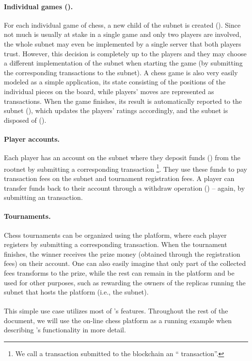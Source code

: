 \paragraph{Individual games ().}
For each individual game of chess, a new child of the  subnet is created ().
Since not much is usually at stake in a single game and only two players are involved,
the whole  subnet may even be implemented by a single server that both players trust.
However, this decision is completely up to the players and they may choose a different implementation of the  subnet
when starting the game (by submitting the corresponding transactions to the  subnet).
A chess game is also very easily modeled as a simple application, its state consisting of the positions of the individual pieces on the board,
while players' moves are represented as transactions.
When the game finishes, its result is automatically reported to the  subnet (), which updates the players' ratings accordingly,
and the  subnet is disposed of ().

\paragraph{Player accounts.}
Each player has an account on the  subnet where they deposit funds () from the rootnet by submitting a corresponding  transaction%
\footnote{We call a transaction submitted to the  blockchain an `` transaction''.}.
They use these funds to pay transaction fees on the  subnet and tournament registration fees.
A player can transfer funds back to their  account through a withdraw operation () -- again, by submitting an  transaction.

\paragraph{Tournaments.}
Chess tournaments can be organized using the platform, where each player registers by submitting a corresponding  transaction.
When the tournament finishes, the winner receives the prize money (obtained through the registration fees) on their  account.
One can also easily imagine that only part of the collected fees transforms to the prize, while the rest can remain in the platform
and be used for other purposes, such as rewarding the owners of the replicas running the subnet that hosts the platform (i.e., the  subnet).

\paragraph{}
This simple use case utilizes most of \ipc's features.
Throughout the rest of the document, we will use the on-line chess platform as a running example when describing \ipc's functionality in more detail.
